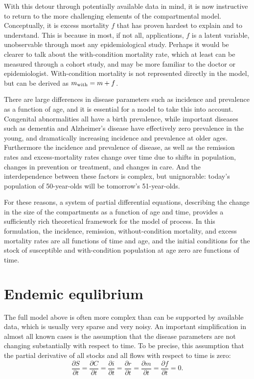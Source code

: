 With this detour through potentially available data in mind, it is now
instructive to return to the more challenging elements of the
compartmental model. Conceptually, it is excess mortality $f$ that has
proven hardest to explain and to understand. This is because in most,
if not all, applications, $f$ is a latent variable, unobservable
through most any epidemiological study. Perhaps it would be clearer to
talk about the with-condition mortality rate, which at least can be
measured through a cohort study, and may be more familiar to the
doctor or epidemiologist. With-condition mortality is not represented
directly in the model, but can be derived as $m_{\text{with}} = m+f$.

There are large differences in disease parameters such as incidence
and prevalence as a function of age, and it is essential for a model
to take this into account.  Congenital abnormalities all have a birth
prevalence, while important diseases such as dementia and Alzheimer's
disease have effectively zero prevalence in the young, and
dramatically increasing incidence and prevalence at older
ages. Furthermore the incidence and prevalence of disease, as well as
the remission rates and excess-mortality rates change over time due to
shifts in population, changes in prevention or treatment, and changes
in care. And the interdependence between these factors is complex, but
unignorable: today's population of 50-year-olds will be tomorrow's
51-year-olds.

For these reasons, a system of partial differential equations,
describing the change in the size of the compartments as a function of
age and time, provides a sufficiently rich theoretical framework for
the model of process.  In this formulation, the incidence, remission,
without-condition mortality, and excess mortality rates are all
functions of time and age, and the initial conditions for the stock of
susceptible and with-condition population at age zero are functions of
time.

\section{Endemic equlibrium}
\label{theory-forward_sim-compartmental_model-simplying_assumptions}

The full model above is often more complex than can be supported by
available data, which is usually very sparse and very noisy.  An
important simplification in almost all known cases is the assumption
that the disease parameters are not changing substantially with
respect to time. To be precise, this assumption that the partial
derivative of all stocks and all flows with respect to time is zero:
\[
\frac{\partial S}{\partial t}
=
\frac{\partial C}{\partial t}
=
\frac{\partial i}{\partial t}
=
\frac{\partial r}{\partial t}
=
\frac{\partial m}{\partial t}
=
\frac{\partial f}{\partial t}
=
0.
\]

